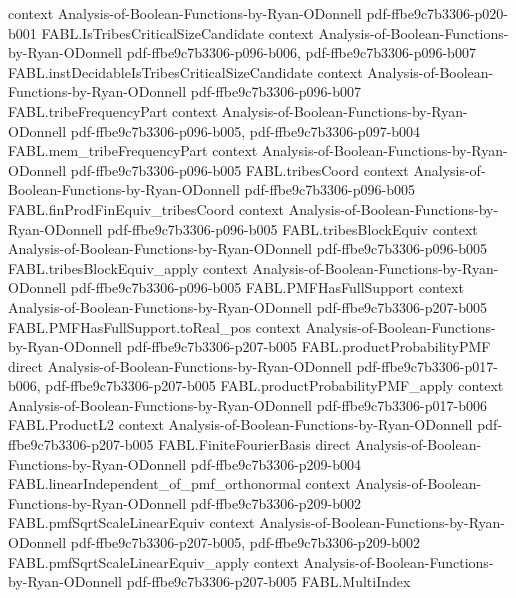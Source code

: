 \begin{theorem}
  {context}
  {Analysis-of-Boolean-Functions-by-Ryan-ODonnell}
  {pdf-ffbe9c7b3306-p020-b001}
\proofstep
  {FABL.IsTribesCriticalSizeCandidate}
  {context}
  {Analysis-of-Boolean-Functions-by-Ryan-ODonnell}
  {pdf-ffbe9c7b3306-p096-b006,
    pdf-ffbe9c7b3306-p096-b007}
\proofstep
  {FABL.instDecidableIsTribesCriticalSizeCandidate}
  {context}
  {Analysis-of-Boolean-Functions-by-Ryan-ODonnell}
  {pdf-ffbe9c7b3306-p096-b007}
\proofstep
  {FABL.tribeFrequencyPart}
  {context}
  {Analysis-of-Boolean-Functions-by-Ryan-ODonnell}
  {pdf-ffbe9c7b3306-p096-b005,
    pdf-ffbe9c7b3306-p097-b004}
\proofstep
  {FABL.mem_tribeFrequencyPart}
  {context}
  {Analysis-of-Boolean-Functions-by-Ryan-ODonnell}
  {pdf-ffbe9c7b3306-p096-b005}
\proofstep
  {FABL.tribesCoord}
  {context}
  {Analysis-of-Boolean-Functions-by-Ryan-ODonnell}
  {pdf-ffbe9c7b3306-p096-b005}
\proofstep
  {FABL.finProdFinEquiv_tribesCoord}
  {context}
  {Analysis-of-Boolean-Functions-by-Ryan-ODonnell}
  {pdf-ffbe9c7b3306-p096-b005}
\proofstep
  {FABL.tribesBlockEquiv}
  {context}
  {Analysis-of-Boolean-Functions-by-Ryan-ODonnell}
  {pdf-ffbe9c7b3306-p096-b005}
\proofstep
  {FABL.tribesBlockEquiv_apply}
  {context}
  {Analysis-of-Boolean-Functions-by-Ryan-ODonnell}
  {pdf-ffbe9c7b3306-p096-b005}
\proofstep
  {FABL.PMFHasFullSupport}
  {context}
  {Analysis-of-Boolean-Functions-by-Ryan-ODonnell}
  {pdf-ffbe9c7b3306-p207-b005}
\proofstep
  {FABL.PMFHasFullSupport.toReal_pos}
  {context}
  {Analysis-of-Boolean-Functions-by-Ryan-ODonnell}
  {pdf-ffbe9c7b3306-p207-b005}
\proofstep
  {FABL.productProbabilityPMF}
  {direct}
  {Analysis-of-Boolean-Functions-by-Ryan-ODonnell}
  {pdf-ffbe9c7b3306-p017-b006,
    pdf-ffbe9c7b3306-p207-b005}
\proofstep
  {FABL.productProbabilityPMF_apply}
  {context}
  {Analysis-of-Boolean-Functions-by-Ryan-ODonnell}
  {pdf-ffbe9c7b3306-p017-b006}
\proofstep
  {FABL.ProductL2}
  {context}
  {Analysis-of-Boolean-Functions-by-Ryan-ODonnell}
  {pdf-ffbe9c7b3306-p207-b005}
\proofstep
  {FABL.FiniteFourierBasis}
  {direct}
  {Analysis-of-Boolean-Functions-by-Ryan-ODonnell}
  {pdf-ffbe9c7b3306-p209-b004}
\proofstep
  {FABL.linearIndependent_of_pmf_orthonormal}
  {context}
  {Analysis-of-Boolean-Functions-by-Ryan-ODonnell}
  {pdf-ffbe9c7b3306-p209-b002}
\proofstep
  {FABL.pmfSqrtScaleLinearEquiv}
  {context}
  {Analysis-of-Boolean-Functions-by-Ryan-ODonnell}
  {pdf-ffbe9c7b3306-p207-b005,
    pdf-ffbe9c7b3306-p209-b002}
\proofstep
  {FABL.pmfSqrtScaleLinearEquiv_apply}
  {context}
  {Analysis-of-Boolean-Functions-by-Ryan-ODonnell}
  {pdf-ffbe9c7b3306-p207-b005}
\proofstep
  {FABL.MultiIndex}

\end{theorem}
